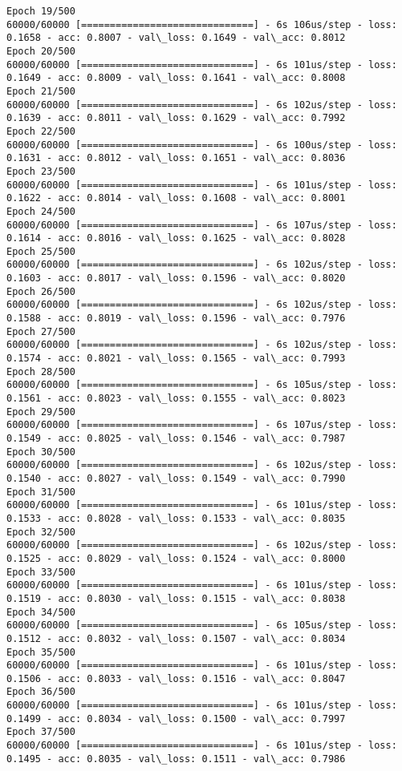 \documentclass[11pt]{article}
\begin{document}
\begin{Verbatim}[commandchars=\\\{\}]
Epoch 19/500
60000/60000 [==============================] - 6s 106us/step - loss: 0.1658 - acc: 0.8007 - val\_loss: 0.1649 - val\_acc: 0.8012
Epoch 20/500
60000/60000 [==============================] - 6s 101us/step - loss: 0.1649 - acc: 0.8009 - val\_loss: 0.1641 - val\_acc: 0.8008
Epoch 21/500
60000/60000 [==============================] - 6s 102us/step - loss: 0.1639 - acc: 0.8011 - val\_loss: 0.1629 - val\_acc: 0.7992
Epoch 22/500
60000/60000 [==============================] - 6s 100us/step - loss: 0.1631 - acc: 0.8012 - val\_loss: 0.1651 - val\_acc: 0.8036
Epoch 23/500
60000/60000 [==============================] - 6s 101us/step - loss: 0.1622 - acc: 0.8014 - val\_loss: 0.1608 - val\_acc: 0.8001
Epoch 24/500
60000/60000 [==============================] - 6s 107us/step - loss: 0.1614 - acc: 0.8016 - val\_loss: 0.1625 - val\_acc: 0.8028
Epoch 25/500
60000/60000 [==============================] - 6s 102us/step - loss: 0.1603 - acc: 0.8017 - val\_loss: 0.1596 - val\_acc: 0.8020
Epoch 26/500
60000/60000 [==============================] - 6s 102us/step - loss: 0.1588 - acc: 0.8019 - val\_loss: 0.1596 - val\_acc: 0.7976
Epoch 27/500
60000/60000 [==============================] - 6s 102us/step - loss: 0.1574 - acc: 0.8021 - val\_loss: 0.1565 - val\_acc: 0.7993
Epoch 28/500
60000/60000 [==============================] - 6s 105us/step - loss: 0.1561 - acc: 0.8023 - val\_loss: 0.1555 - val\_acc: 0.8023
Epoch 29/500
60000/60000 [==============================] - 6s 107us/step - loss: 0.1549 - acc: 0.8025 - val\_loss: 0.1546 - val\_acc: 0.7987
Epoch 30/500
60000/60000 [==============================] - 6s 102us/step - loss: 0.1540 - acc: 0.8027 - val\_loss: 0.1549 - val\_acc: 0.7990
Epoch 31/500
60000/60000 [==============================] - 6s 101us/step - loss: 0.1533 - acc: 0.8028 - val\_loss: 0.1533 - val\_acc: 0.8035
Epoch 32/500
60000/60000 [==============================] - 6s 102us/step - loss: 0.1525 - acc: 0.8029 - val\_loss: 0.1524 - val\_acc: 0.8000
Epoch 33/500
60000/60000 [==============================] - 6s 101us/step - loss: 0.1519 - acc: 0.8030 - val\_loss: 0.1515 - val\_acc: 0.8038
Epoch 34/500
60000/60000 [==============================] - 6s 105us/step - loss: 0.1512 - acc: 0.8032 - val\_loss: 0.1507 - val\_acc: 0.8034
Epoch 35/500
60000/60000 [==============================] - 6s 101us/step - loss: 0.1506 - acc: 0.8033 - val\_loss: 0.1516 - val\_acc: 0.8047
Epoch 36/500
60000/60000 [==============================] - 6s 101us/step - loss: 0.1499 - acc: 0.8034 - val\_loss: 0.1500 - val\_acc: 0.7997
Epoch 37/500
60000/60000 [==============================] - 6s 101us/step - loss: 0.1495 - acc: 0.8035 - val\_loss: 0.1511 - val\_acc: 0.7986

\end{Verbatim}
\end{document}
